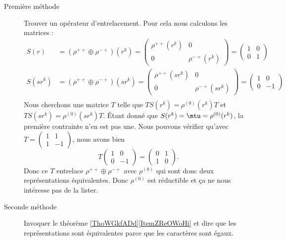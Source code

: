 \begin{enumerate}
\begin{description}
		      \item[Première méthode]
		            Trouver un opérateur d'entrelacement. Pour cela nous calculons les matrices :
		            \begin{subequations}
			            \begin{align}
				            S(r)    & =(\rho^{++}\oplus \rho^{-+})(r^k)=\begin{pmatrix}
					            \rho^{++}(r^k) & 0              \\
					            0              & \rho^{-+}(r^k)
				            \end{pmatrix}=\begin{pmatrix}
					            1 & 0 \\
					            0 & 1
				            \end{pmatrix}   \\
				            S(sr^k) & =(\rho^{++}\oplus \rho^{-+})(sr^k)=\begin{pmatrix}
					            \rho^{++}(sr^k) & 0               \\
					            0               & \rho^{-+}(sr^k)
				            \end{pmatrix}=\begin{pmatrix}
					            1 & 0  \\
					            0 & -1
				            \end{pmatrix} \\
			            \end{align}
		            \end{subequations}
		            Nous cherchons une matrice \( T\) telle que \( TS(r^k)=\rho^{(0)}(r^k)T\) et \( TS(sr^k)=\rho^{(0)}(sr^k)T\). Étant donné que \( S(r^k)=\mtu=\rho^{(0)}(r^k)\), la première contrainte n'en est pas une. Nous pouvons vérifier qu'avec \( T=\begin{pmatrix}
			            1 & 1  \\
			            1 & -1
		            \end{pmatrix}\), nous avons bien
		            \begin{equation}
			            T\begin{pmatrix}
				            1 & 0  \\
				            0 & -1
			            \end{pmatrix}=\begin{pmatrix}
				            0 & 1 \\
				            1 & 0
			            \end{pmatrix}.
		            \end{equation}
		            Donc ce \( T\) entrelace \( \rho^{++}\oplus \rho^{-+}\) avec \( \rho^{(0)}\) qui sont donc deux représentations équivalentes. Donc \( \rho^{(0)}\) est réductible et ça ne nous intéresse pas de la lister.
		      \item[Seconde méthode]
		            Invoquer le théorème \ref{ThoWGkfADd}\ref{ItemZReOWoHi} et dire que les représentations sont équivalentes parce que les caractères sont égaux.


\end{description}
\end{enumerate}
